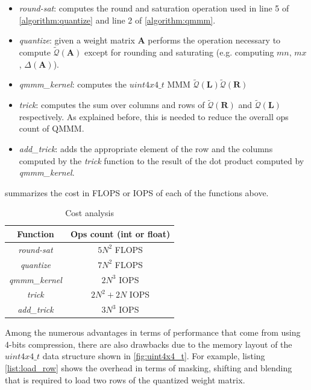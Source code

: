 \begin{itemize}
\item \emph{round-sat}: computes the round and saturation operation used in line 5 of \cref{algorithm:quantize} and line 2 of \cref{algorithm:qmmm}.
\item \emph{quantize}: given a weight matrix $\mathbf{A}$ performs the operation necessary to compute  $\tilde{\mathcal{Q}}(\mathbf{A}) $ except for rounding and saturating (e.g. computing $mn$, $mx$, $\Delta(\mathbf{A})$).
\item \emph{qmmm\_kernel}: computes the  $uint4x4\_t$ MMM $ \tilde{\mathcal{Q}}(\mathbf{L}) \tilde{\mathcal{Q}}(\mathbf{R})$
\item \emph{trick}: computes the sum over columns and rows of $\tilde{\mathcal{Q}}(\mathbf{R})$ and $\tilde{\mathcal{Q}}(\mathbf{L})$ respectively. As explained before, this is needed to reduce the overall ops count of QMMM. 
\item \emph{add\_trick}: adds the appropriate element of the row and the columns computed by the \emph{trick} function to the result of the dot product computed by \emph{qmmm\_kernel}.
\end{itemize}
 summarizes the cost in FLOPS or IOPS of each of the functions above.

\begin{table}
\centering
\begin{tabular}{ c|c } 
 
 Function & Ops count (int or float) \\
 \hline 
 \emph{round-sat} & $5N^2$ FLOPS \\
\emph{quantize} & $7N^2$ FLOPS \\
\emph{qmmm\_kernel} & $2N^3$ IOPS \\
\emph{trick} & $2N^2 + 2N$ IOPS \\
\emph{add\_trick} & $3N^3$ IOPS \\
 \end{tabular}
  \caption{Cost analysis}
\label{tab:cost} 
\end{table}

Among the numerous advantages in terms of performance that come from using 4-bits compression, there are also drawbacks due to the memory layout of the $uint4x4\_t$ data structure shown in \cref{fig:uint4x4_t}. For example, listing \ref{list:load_row} shows the overhead in terms of masking, shifting and blending that is required to load two rows of the quantized weight matrix.

